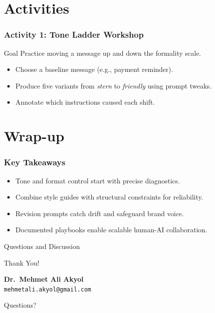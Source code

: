 \documentclass{beamer}
\begin{document}
\section{Activities}

\begin{frame}
    \frametitle{Activity 1: Tone Ladder Workshop}
    \begin{block}{Goal}
        Practice moving a message up and down the formality scale.
    \end{block}
    \begin{itemize}
        \item Choose a baseline message (e.g., payment reminder).
        \item Produce five variants from \emph{stern} to \emph{friendly} using prompt tweaks.
        \item Annotate which instructions caused each shift.
    \end{itemize}
\end{frame}


\section{Wrap-up}

\begin{frame}
    \frametitle{Key Takeaways}
    \begin{itemize}
        \item Tone and format control start with precise diagnostics.
        \item Combine style guides with structural constraints for reliability.
        \item Revision prompts catch drift and safeguard brand voice.
        \item Documented playbooks enable scalable human-AI collaboration.
    \end{itemize}
\end{frame}

\begin{frame}{Questions and Discussion}
    \begin{center}
    {\Huge Thank You!}
    \vspace{1cm}

        \textbf{Dr.\ Mehmet Ali Akyol}\\
        \texttt{mehmetali.akyol@gmail.com}
    \vspace{1cm}

    {\large Questions?}
    \end{center}
\end{frame}
\end{document}
